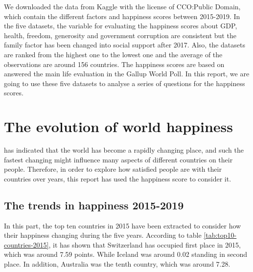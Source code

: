 \documentclass[11pt,a4paper,]{article}
\begin{document}
We downloaded the data from Kaggle with the license of CCO:Public Domain, which contain the different factors and happiness scores between 2015-2019. In the five datasets, the variable for evaluating the happiness scores about GDP, health, freedom, generosity and government corruption are consistent but the family factor has been changed into social support after 2017. Also, the datasets are ranked from the highest one to the lowest one and the average of the observations are around 156 countries. The happiness scores are based on answered the main life evaluation in the Gallup World Poll. In this report, we are going to use these five datasets to analyse a series of questions for the happiness scores.

\clearpage

\hypertarget{the-evolution-of-world-happiness}{%
\section{The evolution of world happiness}\label{the-evolution-of-world-happiness}}

\textcite{helliwell2019world} has indicated that the world has become a rapidly changing place, and such the fastest changing might influence many aspects of different countries on their people. Therefore, in order to explore how satisfied people are with their countries over years, this report has used the happiness score to consider it.

\hypertarget{the-trends-in-happiness-2015-2019}{%
\subsection{The trends in happiness 2015-2019}\label{the-trends-in-happiness-2015-2019}}

In this part, the top ten countries in 2015 have been extracted to consider how their happiness changing during the five years. According to table \ref{tab:top10-countries-2015}, it has shown that Switzerland has occupied first place in 2015, which was around 7.59 points. While Iceland was around 0.02 standing in second place. In addition, Australia was the tenth country, which was around 7.28.
\end{document}
